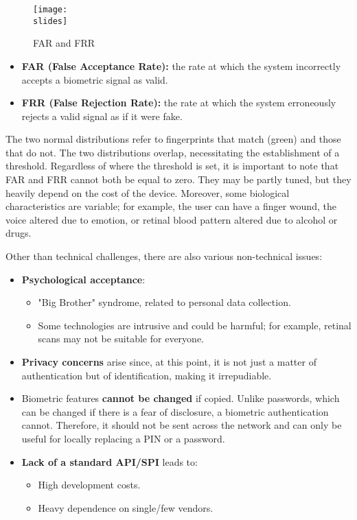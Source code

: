 \begin{figure}[h]
  \centering
  \texttt{[image: \\slides]}
  \caption{FAR and FRR}
\end{figure}

\begin{itemize}
    \item \textbf{FAR (False Acceptance Rate):} the rate at which the system incorrectly accepts a biometric signal as valid.
    \item \textbf{FRR (False Rejection Rate):} the rate at which the system erroneously rejects a valid signal as if it were fake.
\end{itemize}
The two normal distributions refer to fingerprints that match (green) and those that do not. The two distributions overlap, necessitating the establishment of a threshold. Regardless of where the threshold is set, it is important to note that FAR and FRR cannot both be equal to zero.
They may be partly tuned, but they heavily depend on the cost of the device. Moreover, some biological characteristics are variable; for example, the user can have a finger wound, the voice altered due to emotion, or retinal blood pattern altered due to alcohol or drugs.

Other than technical challenges, there are also various non-technical issues:
\begin{itemize}
    \item \textbf{Psychological acceptance}:
        \begin{itemize}
            \item "Big Brother" syndrome, related to personal data collection.
            \item Some technologies are intrusive and could be harmful; for example, retinal scans may not be suitable for everyone.
        \end{itemize}
    \item \textbf{Privacy concerns} arise since, at this point, it is not just a matter of authentication but of identification, making it irrepudiable.
    \item Biometric features \textbf{cannot be changed} if copied. Unlike passwords, which can be changed if there is a fear of disclosure, a biometric authentication cannot. Therefore, it should not be sent across the network and can only be useful for locally replacing a PIN or a password.
    \item \textbf{Lack of a standard API/SPI} leads to:
        \begin{itemize}
            \item High development costs.
            \item Heavy dependence on single/few vendors.
        \end{itemize}
\end{itemize}

